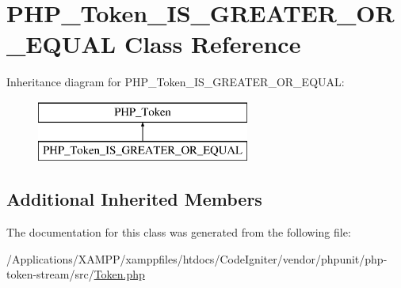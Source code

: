 \hypertarget{class_p_h_p___token___i_s___g_r_e_a_t_e_r___o_r___e_q_u_a_l}{}\section{P\+H\+P\+\_\+\+Token\+\_\+\+I\+S\+\_\+\+G\+R\+E\+A\+T\+E\+R\+\_\+\+O\+R\+\_\+\+E\+Q\+U\+AL Class Reference}
\label{class_p_h_p___token___i_s___g_r_e_a_t_e_r___o_r___e_q_u_a_l}
Inheritance diagram for P\+H\+P\+\_\+\+Token\+\_\+\+I\+S\+\_\+\+G\+R\+E\+A\+T\+E\+R\+\_\+\+O\+R\+\_\+\+E\+Q\+U\+AL\+:\begin{figure}[H]
\begin{center}
\leavevmode
\includegraphics[height=2.000000cm]{class_p_h_p___token___i_s___g_r_e_a_t_e_r___o_r___e_q_u_a_l}
\end{center}
\end{figure}
\subsection*{Additional Inherited Members}


The documentation for this class was generated from the following file\+:\begin{DoxyCompactItemize}
\item 
/\+Applications/\+X\+A\+M\+P\+P/xamppfiles/htdocs/\+Code\+Igniter/vendor/phpunit/php-\/token-\/stream/src/\mbox{\hyperlink{_token_8php}{Token.\+php}}\end{DoxyCompactItemize}
